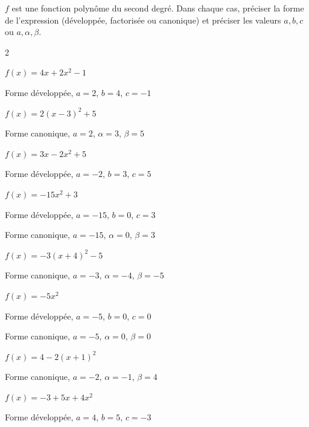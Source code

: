 \documentclass[11pt,a4paper]{article}  %
\begin{document}
$f$ est une fonction polynôme du second degré. Dans chaque cas, préciser la forme de l'expression (développée, factorisée ou canonique) et préciser les valeurs $a, b, c$ ou $a, \alpha, \beta$.
\begin{multicols}{2}
	\begin{enumMet}
		\item $f(x)=4 x+2 x^2-1$
		\begin{corrBox}
			Forme développée, $a = 2$, $b = 4$, $c = -1$
		\end{corrBox}
		\item $f(x)=2(x-3)^2+5$
		\begin{corrBox}
			Forme canonique, $a = 2$, $\alpha = 3$, $\beta = 5$	
		\end{corrBox}
		\item $f(x)=3x-2x^2+5$
		\begin{corrBox}
			Forme développée, $a = -2$, $b = 3$, $c = 5$	
		\end{corrBox}
		\item $f(x)=-15 x^2+3$
		\begin{corrBox}
			Forme développée, $a = -15$, $b = 0$, $c = 3$
			
			Forme canonique, $a = -15$, $\alpha = 0$, $\beta = 3$	
		\end{corrBox}
		\item $f(x)=-3(x+4)^2-5$
		\begin{corrBox}
			Forme canonique, $a = -3$, $\alpha = -4$, $\beta = -5$	
		\end{corrBox}
		\item $f(x)=-5 x^2$
		\begin{corrBox}
			Forme développée, $a = -5$, $b = 0$, $c = 0$
			
			Forme canonique, $a = -5$, $\alpha = 0$, $\beta = 0$	
		\end{corrBox}
		\item $f(x)=4-2(x+1)^2$
		\begin{corrBox}
			Forme canonique, $a = -2$, $\alpha = -1$, $\beta = 4$	
		\end{corrBox}
		\item $f(x)=-3+5x+4x^2$
		\begin{corrBox}
			Forme développée, $a = 4$, $b = 5$, $c = -3$	
		\end{corrBox}
	\end{enumMet}
\end{multicols}

\vspace*{-0.3cm}
\end{document}
